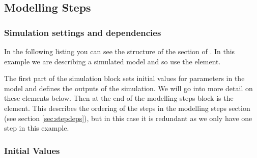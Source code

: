 

\subsection{Modelling Steps}
\label{sec:eg1-modelingSteps}

\subsubsection{Simulation settings and dependencies}

In the following listing 
you can see the structure of the
 section of \pharmml.  In this example we are
describing a simulated model and so use the 
element.



The first part of the simulation block sets initial values for
parameters in the model and defines the outputs of the simulation. We
will go into more detail on these elements below. Then at the end of
the modelling steps block is the 
element. This describes the ordering of the steps in the modelling
steps section (see section \ref{sec:stepdeps}), but in this case it is
redundant as we only have one step in this example.

\subsubsection{Initial Values}

